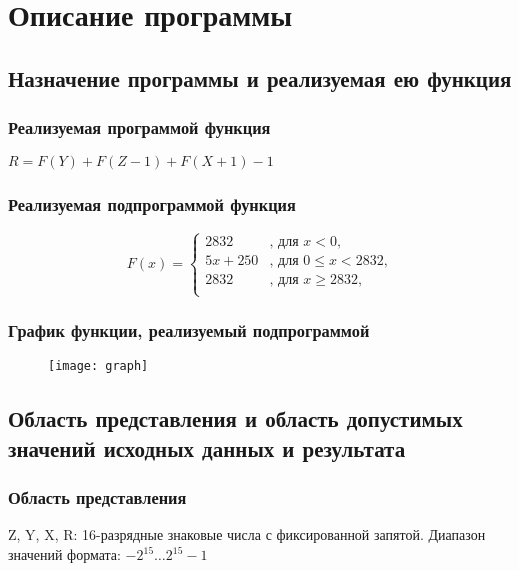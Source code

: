 \section{Описание программы}
\subsection{Назначение программы и реализуемая ею функция}
\subsubsection{Реализуемая программой функция}
	\begin{center}
		$ R = F(Y)+F(Z-1)+F(X+1)-1 $
	\end{center}
\subsubsection{Реализуемая подпрограммой функция}
	\begin{center}
		\[
			F(x) =  \begin{cases}
			2832 & \textrm{, для } x < 0\textrm{,}\\
			5x + 250 & \textrm{, для } 0 \leq x < 2832\textrm{,}\\
			2832 & \textrm{, для } x \geq 2832\textrm{,}\\
			\end{cases}
		\]
	\end{center}

\subsubsection{График функции, реализуемый подпрограммой}
\begin{figure}[H]
	\centering
	\texttt{[image: graph]}
	\label{pic:graph}
\end{figure}

\subsection{Область представления и область допустимых значений исходных данных и результата}
\subsubsection{Область представления}
\noindent Z, Y, X, R: 16-разрядные знаковые числа с фиксированной запятой. Диапазон значений формата: $-2^{15}\ldots2^{15}-1$

